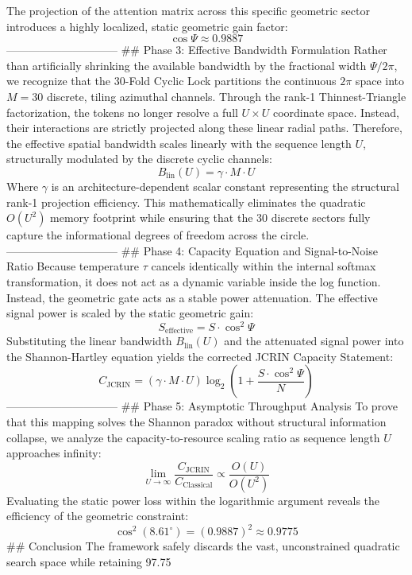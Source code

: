 The projection of the attention matrix across this specific geometric sector introduces a highly localized, static geometric gain factor:
$$\cos\Psi \approx 0.9887$$ 
------------------------------
## Phase 3: Effective Bandwidth Formulation
Rather than artificially shrinking the available bandwidth by the fractional width $\Psi / 2\pi$, we recognize that the 30-Fold Cyclic Lock partitions the continuous $2\pi$ space into $M = 30$ discrete, tiling azimuthal channels.
Through the rank-1 Thinnest-Triangle factorization, the tokens no longer resolve a full $U \times U$ coordinate space. Instead, their interactions are strictly projected along these linear radial paths. Therefore, the effective spatial bandwidth scales linearly with the sequence length $U$, structurally modulated by the discrete cyclic channels:
$$B_{\text{lin}}(U) = \gamma \cdot M \cdot U$$ 
Where $\gamma$ is an architecture-dependent scalar constant representing the structural rank-1 projection efficiency. This mathematically eliminates the quadratic $O(U^2)$ memory footprint while ensuring that the 30 discrete sectors fully capture the informational degrees of freedom across the circle.
------------------------------
## Phase 4: Capacity Equation and Signal-to-Noise Ratio
Because temperature $\tau$ cancels identically within the internal softmax transformation, it does not act as a dynamic variable inside the log function. Instead, the geometric gate acts as a stable power attenuation. The effective signal power is scaled by the static geometric gain:
$$S_{\text{effective}} = S \cdot \cos^2\Psi$$ 
Substituting the linear bandwidth $B_{\text{lin}}(U)$ and the attenuated signal power into the Shannon-Hartley equation yields the corrected JCRIN Capacity Statement:
$$C_{\text{JCRIN}} = (\gamma \cdot M \cdot U) \log_2 \left( 1 + \frac{S \cdot \cos^2\Psi}{N} \right)$$ 
------------------------------
## Phase 5: Asymptotic Throughput Analysis
To prove that this mapping solves the Shannon paradox without structural information collapse, we analyze the capacity-to-resource scaling ratio as sequence length $U$ approaches infinity:
$$\lim_{U \to \infty} \frac{C_{\text{JCRIN}}}{C_{\text{Classical}}} \propto \frac{O(U)}{O(U^2)}$$ 
Evaluating the static power loss within the logarithmic argument reveals the efficiency of the geometric constraint:
$$\cos^2(8.61^\circ) = (0.9887)^2 \approx 0.9775$$ 
## Conclusion
The framework safely discards the vast, unconstrained quadratic search space while retaining 97.75%

